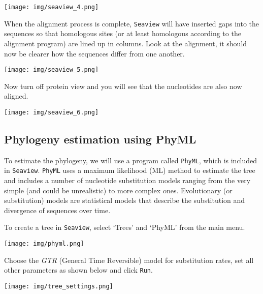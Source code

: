\documentclass[11pt]{article}
\begin{document}
\begin{center}
\texttt{[image: img/seaview\_4.png]}
\end{center}


When the alignment process is complete, \texttt{Seaview} will have
inserted gaps into the sequences so that homologous sites (or at least
homologous according to the alignment program) are lined up in columns.
Look at the alignment, it should now be clearer how the sequences differ
from one another.


\begin{center}
\texttt{[image: img/seaview\_5.png]}
\end{center}


    Now turn off protein view and you will see that the nucleotides are also
now aligned.


\begin{center}
\texttt{[image: img/seaview\_6.png]}
\end{center}


    \hypertarget{phylogeny-estimation-using-phyml}{%
\subsection{Phylogeny estimation using
PhyML}\label{phylogeny-estimation-using-phyml}}

To estimate the phylogeny, we will use a program called \texttt{PhyML},
which is included in \texttt{Seaview}. \texttt{PhyML} uses a maximum
likelihood (ML) method to estimate the tree and includes a number of
nucleotide substitution models ranging from the very simple (and could
be unrealistic) to more complex ones. Evolutionary (or substitution)
models are statistical models that describe the substitution and
divergence of sequences over time.

To create a tree in \texttt{Seaview}, select `Trees' and `PhyML' from
the main menu.


\begin{center}
\texttt{[image: img/phyml.png]}
\end{center}


    Choose the \textit{GTR} (General Time Reversible) model for substitution
rates, set all other parameters as shown below and click \texttt{Run}.


\begin{center}
\texttt{[image: img/tree\_settings.png]}
\end{center}
\end{document}
